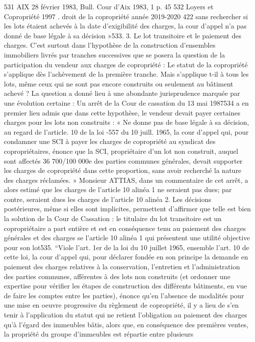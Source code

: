 531 AIX 28 février 1983, Bull. Cour d'Aix 1983, 1 p. 45
532 Loyers et Copropriété 1997 .
droit de la copropriété année 2019-2020
422
sans rechercher si les lots étaient achevés à la date d'exigibilité des charges, la cour d'appel n'a pas donné de base légale à sa décision »533.
3. Le lot transitoire et le paiement des charges.
C'est surtout dans l'hypothèse de la construction d’ensembles immobiliers livrés par tranches successives que se posera la question de la participation du vendeur aux charges de copropriété :
Le statut de la copropriété s'applique dès l'achèvement de la première tranche. Mais s'applique t-il à tous les lots, même ceux qui ne sont pas encore construits ou seulement au bâtiment achevé ?
La question a donné lieu à une abondante jurisprudence marquée par une évolution certaine :
Un arrêt de la Cour de cassation du 13 mai 1987534 a en premier lieu admis que dans cette hypothèse, le vendeur devait payer certaines charges pour les lots non construits :
« Ne donne pas de base légale à sa décision, au regard de l'article. 10 de la loi -557 du 10 juill. 1965, la cour d'appel qui, pour condamner une SCI à payer les charges de copropriété au syndicat des copropriétaires, énonce que la SCI, propriétaire d'un lot non construit, auquel sont affectés 36 700/100 000e des parties communes générales, devait supporter les charges de copropriété dans cette proportion, sans avoir recherché la nature des charges réclamées. »
Monsieur ATTIAS, dans un commentaire de cet arrêt, a alors estimé que les charges de l'article 10 alinéa 1 ne seraient pas dues; par contre, seraient dues les charges de l'article 10 alinéa 2.
Les décisions postérieures, même si elles sont implicites, permettent d'affirmer que telle est bien la solution de la Cour de Cassation : le titulaire du lot transitoire est un copropriétaire a part entière et est en conséquence tenu au paiement des charges générales et des charges se l'article 10 alinéa 1 qui présentent une utilité objective pour son lot535.
“Viole l'art. 1er de la loi du 10 juillet 1965, ensemble l'art. 10 de cette loi, la cour d'appel qui, pour déclarer fondée en son principe la demande en paiement des charges relatives à la conservation, l'entretien et l'administration des parties communes, afférentes à des lots non construits (et ordonner une expertise pour vérifier les étapes de construction des différents bâtiments, en vue de faire les comptes entre les parties), énonce qu'en l'absence de modalités pour une mise en oeuvre progressive du règlement de copropriété, il y a lieu de s'en tenir à l'application du statut qui ne retient l'obligation au paiement des charges qu'à l'égard des immeubles bâtis, alors que, en conséquence des premières ventes, la propriété du groupe d'immeubles est répartie entre plusieurs

